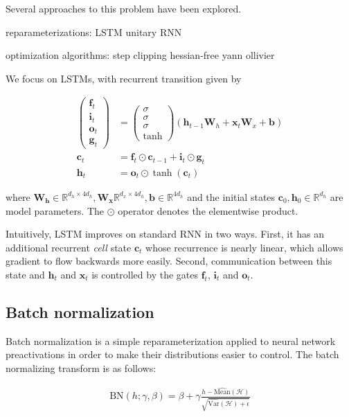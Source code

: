 \documentclass{article} %
\newcommand{\vect}[1]{\mathbf{#1}}
\newcommand{\mat}[1]{\mathbf{#1}}
\newcommand{\ewprod}{\odot}
\newcommand{\reals}{\mathbb{R}}
\begin{document}
Several approaches to this problem have been explored.

reparameterizations:
LSTM
unitary RNN

optimization algorithms:
step clipping
hessian-free
yann ollivier

We focus on LSTMs, with recurrent transition given by

\begin{align}
\left(\begin{array}{ccc}
\vect{f}_t \\
\vect{i}_t \\
\vect{o}_t \\
\vect{g}_t
\end{array}\right)
 &=
\left(\begin{array}{ccc}
\sigma \\
\sigma \\
\sigma \\
\tanh
\end{array}\right)
\left(
 \vect{h}_{t-1} \mat{W}_h +
 \vect{x}_t    \mat{W}_x +
 \vect{b}
\right) \\
\vect{c}_t &= \vect{f}_t \ewprod \vect{c}_{t-1} +
              \vect{i}_t \ewprod \vect{g}_t \\
\vect{h}_t &= \vect{o}_t \ewprod \tanh(\vect{c}_t)
\end{align}

where $\vect{W_h} \in \reals^{d_h \times 4 d_h}, \vect{W_x} \reals^{d_x \times 4 d_h}, \vect{b} \in \reals^{4 d_h}$ and the initial states $\vect{c}_0, \vect{h}_0 \in \reals^{d_h}$ are model parameters.
The $\ewprod$ operator denotes the elementwise product.

Intuitively, LSTM improves on standard RNN in two ways.
First, it has an additional recurrent \emph{cell} state $\vect{c}_t$ whose recurrence is nearly linear, which allows gradient to flow backwards more easily.
Second, communication between this state and $\vect{h}_t$ and $\vect{x}_t$ is controlled by the gates $\vect{f}_t$, $\vect{i}_t$ and $\vect{o}_t$.

\subsection{Batch normalization}

Batch normalization is a simple reparameterization applied to neural network preactivations in order to make their distributions easier to control.
The batch normalizing transform is as follows:

\begin{align}
\mathrm{BN}(h; \gamma, \beta) =
  \beta + \gamma
  \frac{h -   \widehat{\mathrm{Mean}}(\mathcal{H})}
       {\sqrt{\widehat{\mathrm{Var }}(\mathcal{H}) + \epsilon}}
\end{align}
\end{document}
